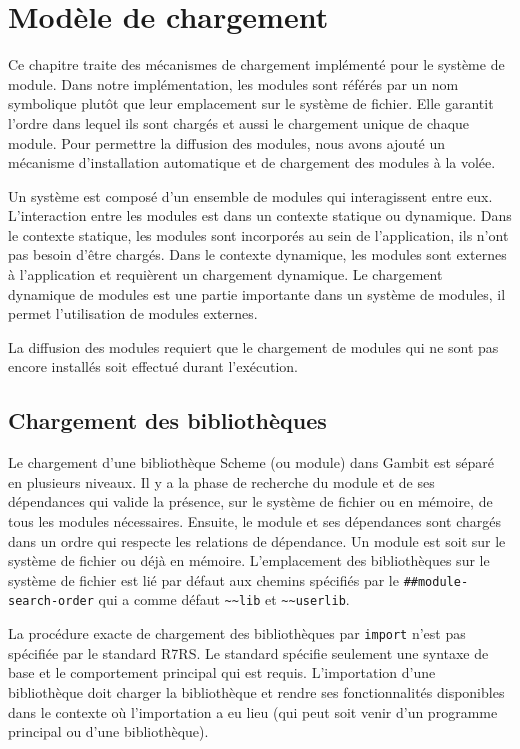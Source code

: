 
\chapter{Modèle de chargement}
\label{ch:loading-model}

Ce chapitre traite des mécanismes de chargement implémenté pour le système de
module.  Dans notre implémentation, les modules sont référés par un nom
symbolique plutôt que leur emplacement sur le système de fichier. Elle garantit
l'ordre dans lequel ils sont chargés et aussi le chargement unique de chaque
module. Pour permettre la diffusion des modules, nous avons ajouté un mécanisme
d'installation automatique et de chargement des modules à la volée.

Un système est composé d'un ensemble de modules qui interagissent entre eux.
L'interaction entre les modules est dans un contexte statique ou dynamique.
Dans le contexte statique, les modules sont incorporés au sein de
l'application, ils n'ont pas besoin d'être chargés. Dans le contexte dynamique,
les modules sont externes à l'application et requièrent un chargement
dynamique.  Le chargement dynamique de modules est une partie importante dans
un système de modules, il permet l'utilisation de modules externes.

La diffusion des modules requiert que le chargement de modules qui ne sont
pas encore installés soit effectué durant l'exécution.

\section{Chargement des bibliothèques}


Le chargement d'une bibliothèque Scheme (ou module) dans Gambit est séparé en
plusieurs niveaux. Il y a la phase de recherche du module et de ses dépendances
qui valide la présence, sur le système de fichier ou en mémoire, de tous les
modules nécessaires.  Ensuite, le module et ses dépendances sont chargés dans un
ordre qui respecte les relations de dépendance.  Un module est soit sur le
système de fichier ou déjà en mémoire.  L'emplacement des bibliothèques sur le système de
fichier est lié par défaut aux chemins spécifiés par le
\lstinline{##module-search-order} qui a comme défaut \lstinline{~~lib} et
\lstinline{~~userlib}.

La procédure exacte de chargement des bibliothèques par \texttt{import} n'est pas
spécifiée par le standard R7RS. Le standard spécifie seulement une syntaxe de
base et le comportement principal qui est requis. L'importation d'une
bibliothèque doit charger la bibliothèque et rendre ses fonctionnalités
disponibles dans le contexte où l'importation a eu lieu (qui peut soit venir d'un
programme principal ou d'une bibliothèque).

